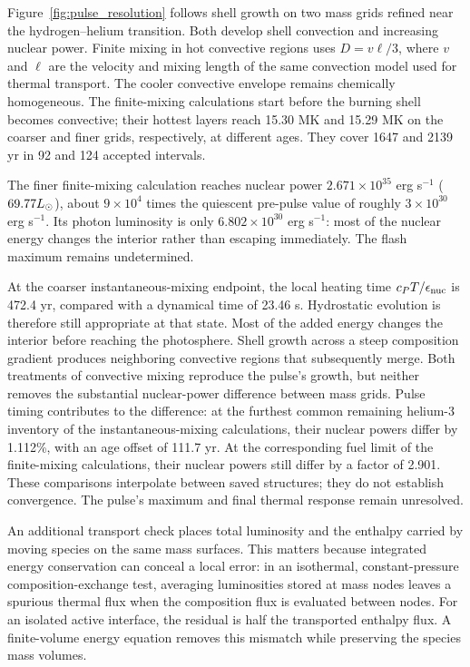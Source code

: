 \documentclass[11pt,letterpaper]{article}
\begin{document}
Figure~\ref{fig:pulse_resolution} follows shell growth on two mass grids
refined near the hydrogen--helium transition. Both develop shell convection
and increasing nuclear power. Finite mixing in hot convective regions uses
$D=v\ell/3$, where $v$ and $\ell$ are the velocity and mixing length of the
same convection model used for thermal transport. The cooler convective
envelope remains chemically homogeneous. The finite-mixing calculations
start before the burning shell becomes convective; their hottest layers
reach 15.30 MK and 15.29 MK on the coarser and finer grids, respectively,
at different ages. They cover 1647 and 2139 yr in 92 and 124 accepted intervals.

The finer finite-mixing calculation reaches nuclear power
$2.671\times10^{35}$ erg s$^{-1}$ ($69.77L_\odot$), about $9\times10^4$ times
the quiescent pre-pulse value of roughly $3\times10^{30}$ erg s$^{-1}$.
Its photon luminosity is only $6.802\times10^{30}$ erg s$^{-1}$:
most of the nuclear energy changes the interior rather than escaping
immediately. The flash maximum remains undetermined.

At the coarser instantaneous-mixing endpoint, the local heating time
$c_P T/\epsilon_{\rm nuc}$ is 472.4 yr, compared with a dynamical time of
23.46 s. Hydrostatic evolution is therefore still appropriate at that state.
Most of the added energy changes the interior before reaching the photosphere.
Shell growth across a steep composition gradient produces neighboring
convective regions that subsequently merge. Both treatments of convective
mixing reproduce the pulse's growth, but neither removes the substantial
nuclear-power difference between mass grids. Pulse timing contributes to the
difference: at the furthest common remaining helium-3 inventory of the
instantaneous-mixing calculations, their nuclear powers differ by 1.112\%,
with an age offset of 111.7 yr. At the corresponding fuel limit of the
finite-mixing calculations, their nuclear powers still differ by a factor
of 2.901. These comparisons interpolate between saved structures; they do
not establish convergence. The pulse's maximum and final thermal response
remain unresolved.


An additional transport check places total luminosity and the enthalpy
carried by moving species on the same mass surfaces. This matters because
integrated energy conservation can conceal a local error: in an isothermal,
constant-pressure composition-exchange test, averaging luminosities stored
at mass nodes leaves a spurious thermal flux when the composition flux is
evaluated between nodes. For an isolated active interface, the residual is
half the transported enthalpy flux. A finite-volume energy equation removes
this mismatch while preserving the species mass volumes.
\end{document}
